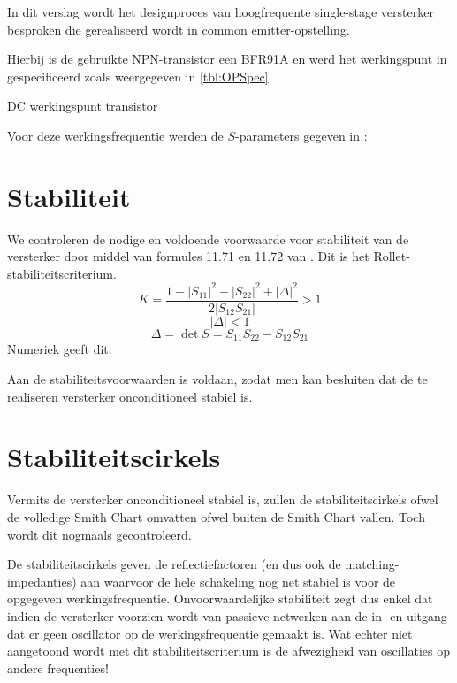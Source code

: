 
    In dit verslag wordt het designproces van hoogfrequente single-stage
    versterker besproken die gerealiseerd wordt in common emitter-opstelling.

    Hierbij is de gebruikte NPN-transistor een BFR91A en werd
    het werkingspunt in \cite{lesWendy} gespecificeerd zoals weergegeven in
    \autoref{tbl:OPSpec}.
      \begin{table}[h!]
        \begin{center}

        \caption{DC werkingspunt transistor}
        \label{tbl:OPSpec}
        
        \end{center}
      \end{table} 
    
    Voor deze werkingsfrequentie werden de $S$-parameters gegeven in \cite{lesWendy}:
    
    
\section{Stabiliteit}
    We controleren de nodige en voldoende voorwaarde voor stabiliteit van de versterker
    door middel van formules 11.71 en 11.72 van \cite{Pozar}.
    Dit is het Rollet-stabiliteitscriterium.
    \[
      K = \frac{1 - \left| S_{11} \right|^2 - \left| S_{22} \right|^2 + \left| \Delta \right|^2}{2 \left| S_{12}S_{21} \right|} > 1
    \]
    \[
      \left| \Delta \right| < 1
    \]
    \[
      \Delta = \det{S} = S_{11}S_{22} - S_{12}S_{21}
    \]
    Numeriek geeft dit:
    
    Aan de stabiliteitsvoorwaarden is voldaan, zodat men kan besluiten dat de te
    realiseren versterker onconditioneel stabiel is.
  \section{Stabiliteitscirkels}
    Vermits de versterker onconditioneel stabiel is, zullen de stabiliteitscirkels
    ofwel de volledige Smith Chart omvatten ofwel buiten de Smith Chart vallen.
    Toch wordt dit nogmaals gecontroleerd.

    De stabiliteitscirkels geven de reflectiefactoren (en dus ook de matching-
    impedanties) aan waarvoor de hele schakeling nog net stabiel is voor de
    opgegeven werkingsfrequentie. Onvoorwaardelijke stabiliteit zegt dus enkel
    dat indien de versterker voorzien wordt van passieve netwerken aan de in-
    en uitgang dat er geen oscillator op de werkingsfrequentie gemaakt is.
    Wat echter niet aangetoond wordt met dit stabiliteitscriterium is de
    afwezigheid van oscillaties op andere frequenties!
    
